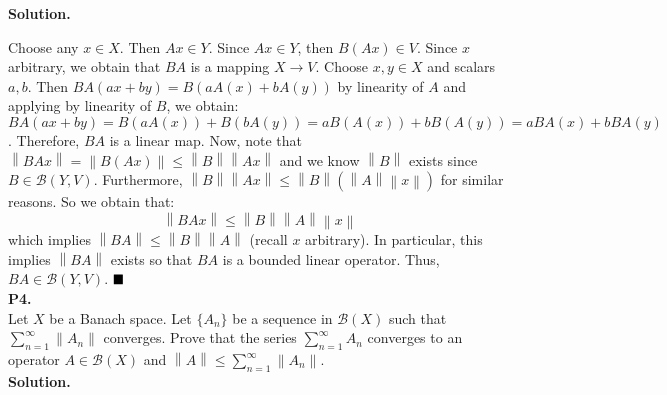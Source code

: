 \documentclass{article}
\newcommand{\norm}[1]{\left\lVert#1\right\rVert}
\begin{document}
    \textbf{Solution.}

    Choose any $x\in X$. Then $Ax\in Y$. Since $Ax\in Y$, then $B(Ax)\in V$. Since $x$ arbitrary, we obtain that $BA$ is a mapping
    $X\to V$. Choose $x,y\in X$ and scalars $a,b$. Then $BA(ax+by) = B(aA(x)+bA(y))$ by linearity of $A$ and applying by linearity
    of $B$, we obtain: $BA(ax+by) = B(aA(x)) + B(bA(y)) = aB(A(x))+bB(A(y)) = aBA(x) + bBA(y)$. Therefore, $BA$ is a linear
    map. Now, note that $\norm{BAx} = \norm{B(Ax)} \leq \norm{B}\norm{Ax}$ and we know $\norm{B}$ exists since $B\in\mathcal{B}(Y,V)$.
    Furthermore, $\norm{B}\norm{Ax}\leq \norm{B}(\norm{A}\norm{x})$ for similar reasons. So we obtain that:
    \[ \norm{BAx} \leq \norm{B}\norm{A}\norm{x} \]
    which implies $\norm{BA}\leq\norm{B}\norm{A}$ (recall $x$ arbitrary). 
    In particular, this implies $\norm{BA}$ exists so that $BA$ is a bounded linear operator. Thus, $BA\in\mathcal{B}(Y,V)$.
    $\hfill\blacksquare$\\

    \textbf{P4.}\\

    Let $X$ be a Banach space. Let $\{A_n\}$ be a sequence in $\mathcal{B}(X)$ such that $\sum_{n=1}^{\infty} \norm{A_n}$
    converges. Prove that the series $\sum_{n=1}^{\infty} A_n$ converges to an operator $A\in\mathcal{B}(X)$ and
    $\norm{A}\leq\sum_{n=1}^{\infty} \norm{A_n}$.\\

    \textbf{Solution.}\\
\end{document}
